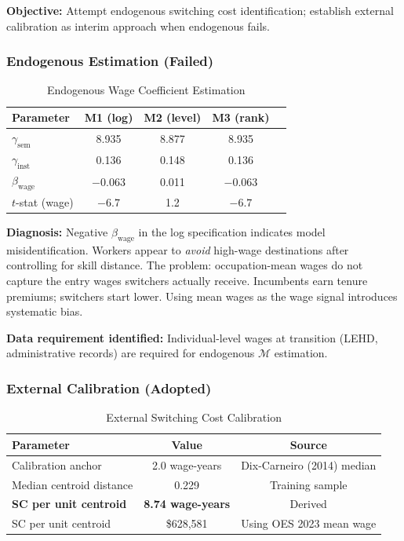 \documentclass[12pt]{article}
\begin{document}
\textbf{Objective:} Attempt endogenous switching cost identification; establish external calibration as interim approach when endogenous fails.


\subsubsection{Endogenous Estimation (Failed)}


\begin{table}[h!]
\centering
\caption{Endogenous Wage Coefficient Estimation}
\label{tab:endogenous-wage}
\begin{tabular}{lcccc}
\toprule
\textbf{Parameter} & \textbf{M1 (log)} & \textbf{M2 (level)} & \textbf{M3 (rank)} \\
\midrule
$\gamma_{\mathrm{sem}}$ & 8.935 & 8.877 & 8.935 \\
$\gamma_{\mathrm{inst}}$ & 0.136 & 0.148 & 0.136 \\
$\beta_{\mathrm{wage}}$ & $-0.063$ & 0.011 & $-0.063$ \\
$t$-stat (wage) & $-6.7$ & 1.2 & $-6.7$ \\
\bottomrule
\end{tabular}
\end{table}


\textbf{Diagnosis:} Negative $\beta_{\mathrm{wage}}$ in the log specification indicates model misidentification. Workers appear to \emph{avoid} high-wage destinations after controlling for skill distance. The problem: occupation-mean wages do not capture the entry wages switchers actually receive. Incumbents earn tenure premiums; switchers start lower. Using mean wages as the wage signal introduces systematic bias.

\textbf{Data requirement identified:} Individual-level wages at transition (LEHD, administrative records) are required for endogenous $\mathcal{M}$ estimation.


\subsubsection{External Calibration (Adopted)}


\begin{table}[h!]
\centering
\caption{External Switching Cost Calibration}
\label{tab:external-calibration}
\begin{tabular}{lcc}
\toprule
\textbf{Parameter} & \textbf{Value} & \textbf{Source} \\
\midrule
Calibration anchor & 2.0 wage-years & Dix-Carneiro (2014) median \\
Median centroid distance & 0.229 & Training sample \\
\textbf{SC per unit centroid} & \textbf{8.74 wage-years} & Derived \\
SC per unit centroid & \$628,581 & Using OES 2023 mean wage \\
\bottomrule
\end{tabular}
\end{table}
\end{document}
